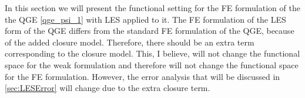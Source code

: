 In this section we will present the functional setting for the FE formulation of the the
QGE \eqref{qge_psi_1} with LES applied to it. The FE formulation of the LES form of the
QGE differs from the standard FE formulation of the QGE, because of the added closure model.
Therefore, there should be an extra term corresponding to the closure model. This, I believe, will
not change the functional space for the weak formulation and therefore will not change the
functional space for the FE formulation. However, the error analysis that will be discussed in
\autoref{sec:LESError} will change due to the extra closure term.
